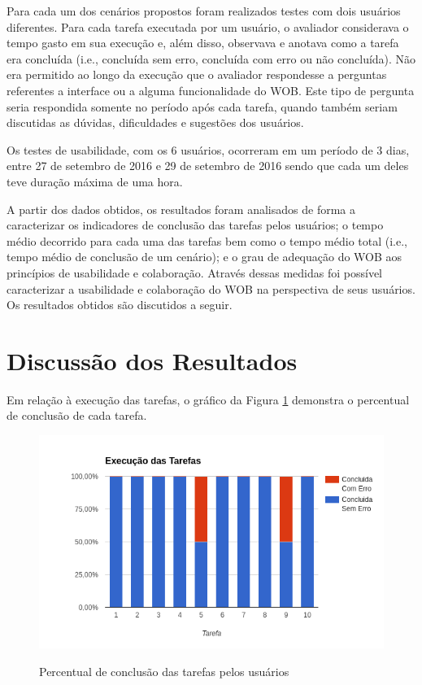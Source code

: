 Para cada um dos cenários propostos foram realizados testes com dois usuários diferentes. 
Para cada tarefa executada por um usuário, o avaliador considerava o tempo gasto em sua 
execução e, além disso, observava e anotava como a tarefa era concluída (i.e., concluída 
sem erro, concluída com erro ou não concluída). Não era permitido ao longo da execução
que o avaliador respondesse a perguntas referentes a interface ou a alguma funcionalidade 
do WOB. Este tipo de pergunta seria respondida somente no período após cada tarefa, quando 
também seriam discutidas as dúvidas, dificuldades e sugestões dos usuários. 

Os testes de usabilidade, com os 6 usuários, ocorreram em um período de 3 dias, entre 27 de 
setembro de 2016 e 29 de setembro de 2016 sendo que cada um deles teve duração máxima de 
uma hora.

A partir dos dados obtidos, os resultados foram analisados de forma a caracterizar os 
indicadores de conclusão das tarefas pelos usuários; o tempo médio decorrido para cada uma 
das tarefas bem como o tempo médio total (i.e., tempo médio de conclusão de um cenário); e 
o grau de adequação do WOB aos princípios de usabilidade e colaboração. Através dessas 
medidas foi possível caracterizar a usabilidade e colaboração do WOB na perspectiva de 
seus usuários. Os resultados obtidos são discutidos a seguir.

\section{Discussão dos Resultados}
\label{sec:metodologia-resultados}

Em relação à execução das tarefas, o gráfico da Figura \ref{fig:avaliacao-tarefas} demonstra 
o percentual de conclusão de cada tarefa.

\begin{figure}[!htb]
    \centering
    \caption{Percentual de conclusão das tarefas pelos usuários}
    \includegraphics[width=1\textwidth]{./04-figuras/avaliacao-tarefas}
    \label{fig:avaliacao-tarefas}
\end{figure}

